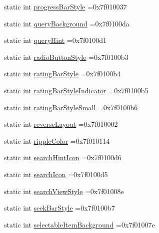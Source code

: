 \begin{DoxyCompactItemize}
\item 
static int \hyperlink{classandroid_1_1support_1_1v7_1_1recyclerview_1_1R_1_1attr_af8f4543d9d3f4a921bb071305f4396ca}{progress\+Bar\+Style} =0x7f010037
\item 
static int \hyperlink{classandroid_1_1support_1_1v7_1_1recyclerview_1_1R_1_1attr_af3d1dc2803e1890a53351566a66b15da}{query\+Background} =0x7f0100da
\item 
static int \hyperlink{classandroid_1_1support_1_1v7_1_1recyclerview_1_1R_1_1attr_a5e6cb9aa9d166d0c1982413872b0da40}{query\+Hint} =0x7f0100d1
\item 
static int \hyperlink{classandroid_1_1support_1_1v7_1_1recyclerview_1_1R_1_1attr_aecfbbcc95a1f33726ae6ac719b18580e}{radio\+Button\+Style} =0x7f0100b3
\item 
static int \hyperlink{classandroid_1_1support_1_1v7_1_1recyclerview_1_1R_1_1attr_aab7ce4b9d7b6999e71323e7b118ed9a1}{rating\+Bar\+Style} =0x7f0100b4
\item 
static int \hyperlink{classandroid_1_1support_1_1v7_1_1recyclerview_1_1R_1_1attr_a7257f910e3a523f11e6ed0a7efdbe3ac}{rating\+Bar\+Style\+Indicator} =0x7f0100b5
\item 
static int \hyperlink{classandroid_1_1support_1_1v7_1_1recyclerview_1_1R_1_1attr_af6f8659da5c1e8e0b300ee3a136df987}{rating\+Bar\+Style\+Small} =0x7f0100b6
\item 
static int \hyperlink{classandroid_1_1support_1_1v7_1_1recyclerview_1_1R_1_1attr_a8dbb6d447b1211e029c76c2ad9424658}{reverse\+Layout} =0x7f010002
\item 
static int \hyperlink{classandroid_1_1support_1_1v7_1_1recyclerview_1_1R_1_1attr_a8c1307e77d103cc8df93c49fe656d8b5}{ripple\+Color} =0x7f010114
\item 
static int \hyperlink{classandroid_1_1support_1_1v7_1_1recyclerview_1_1R_1_1attr_aef6730a6bb29733d5e508bb634dcad80}{search\+Hint\+Icon} =0x7f0100d6
\item 
static int \hyperlink{classandroid_1_1support_1_1v7_1_1recyclerview_1_1R_1_1attr_ad0ab7b7b9698816f21b04e3f5dd1f3ed}{search\+Icon} =0x7f0100d5
\item 
static int \hyperlink{classandroid_1_1support_1_1v7_1_1recyclerview_1_1R_1_1attr_a3a617212305851606283bce3e5a054cd}{search\+View\+Style} =0x7f01008e
\item 
static int \hyperlink{classandroid_1_1support_1_1v7_1_1recyclerview_1_1R_1_1attr_a68174966c0b9b6567b9a55fe38ef7e3e}{seek\+Bar\+Style} =0x7f0100b7
\item 
static int \hyperlink{classandroid_1_1support_1_1v7_1_1recyclerview_1_1R_1_1attr_a354f075fc14b64fcdc73d3d6e6ad78e0}{selectable\+Item\+Background} =0x7f01007e

\end{DoxyCompactItemize}
